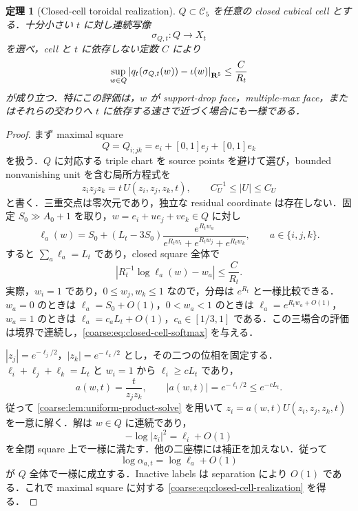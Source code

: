 \documentclass[a4paper,11pt]{ltjsarticle}
\numberwithin{equation}{section}
\theoremstyle{plain}
\newtheorem{theorem}{定理}[section]
\theoremstyle{definition}
\theoremstyle{remark}
\newcommand{\Cfive}{\mathcal C_5}\newcommand{\dsq}{d_{\square}}\newcommand{\Lt}{L_t}\newcommand{\Rt}{R_t}
\begin{document}
\begin{theorem}[Closed-cell toroidal realization]\label{coarse:thm:closed-cell-realization}
$Q\subset\Cfive$ を任意の closed cubical cell とする．十分小さい $t$ に対し連続写像
\[
 \sigma_{Q,t}:Q\longrightarrow X_t
\]
を選べ，cell と $t$ に依存しない定数 $C$ により
\begin{equation}\label{coarse:eq:closed-cell-realization}
 \sup_{w\in Q}\left|q_t(\sigma_{Q,t}(w))-\iota(w)\right|_{\mathbf R^5}
 \le \frac{C}{R_t}
\end{equation}
が成り立つ．特にこの評価は，$w$ が support-drop face，multiple-max face，またはそれらの交わりへ $t$ に依存する速さで近づく場合にも一様である．
\end{theorem}

\begin{proof}
まず maximal square
\[
 Q=Q_{i;jk}=e_i+[0,1]e_j+[0,1]e_k
\]
を扱う．$Q$ に対応する triple chart を source points を避けて選び，bounded nonvanishing unit を含む局所方程式を
\begin{equation}\label{coarse:eq:closed-cell-local-product}
 z_i z_j z_k=t\,U(z_i,z_j,z_k,t),
 \qquad C_U^{-1}\le |U|\le C_U
\end{equation}
と書く．三重交点は零次元であり，独立な residual coordinate は存在しない．固定 $S_0\gg A_0+1$ を取り，$w=e_i+u e_j+v e_k\in Q$ に対し
\begin{equation}\label{coarse:eq:closed-cell-soft-radii}
 \ell_a(w)=S_0+(L_t-3S_0)
 \frac{e^{R_t w_a}}{e^{R_t w_i}+e^{R_t w_j}+e^{R_t w_k}},
 \qquad a\in\{i,j,k\}.
\end{equation}
すると $\sum_a\ell_a=L_t$ であり，closed square 全体で
\begin{equation}\label{coarse:eq:closed-cell-softmax}
 \left|R_t^{-1}\log\ell_a(w)-w_a\right|\le \frac{C}{R_t}.
\end{equation}
実際，$w_i=1$ であり，$0\le w_j,w_k\le1$ なので，分母は $e^{R_t}$ と一様比較できる．$w_a=0$ のときは $\ell_a=S_0+O(1)$，$0<w_a<1$ のときは $\ell_a=e^{R_t w_a+O(1)}$，$w_a=1$ のときは $\ell_a=c_aL_t+O(1)$，$c_a\in[1/3,1]$ である．この三場合の評価は境界で連続し，\eqref{coarse:eq:closed-cell-softmax} を与える．

$|z_j|=e^{-\ell_j/2}$，$|z_k|=e^{-\ell_k/2}$ とし，その二つの位相を固定する．
$\ell_i+\ell_j+\ell_k=L_t$ と $w_i=1$ から $\ell_i\ge cL_t$ であり，
\[
 a(w,t)=\frac{t}{z_jz_k},
 \qquad |a(w,t)|=e^{-\ell_i/2}\le e^{-cL_t}.
\]
従って \cref{coarse:lem:uniform-product-solve} を用いて
$z_i=a(w,t)U(z_i,z_j,z_k,t)$ を一意に解く．解は $w\in Q$ に連続であり，
\[
 -\log|z_i|^2=\ell_i+O(1)
\]
を全閉 square 上で一様に満たす．他の二座標には補正を加えない．従って
\[
 \log\alpha_{a,t}=\log\ell_a+O(1)
\]
が $Q$ 全体で一様に成立する．Inactive labels は separation により $O(1)$ である．これで maximal square に対する \eqref{coarse:eq:closed-cell-realization} を得る．


\end{proof}
\end{document}
